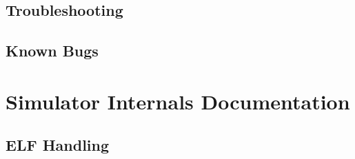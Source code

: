 \documentclass[letterpaper, 11pt, twoside]{article}
\begin{document}
\subsection{Troubleshooting}
\paragraph{}

\subsection{Known Bugs}
\paragraph{}

\clearpage

\section[Internals]{Simulator Internals Documentation}

\paragraph{}


\subsection{ELF Handling}
\end{document}
